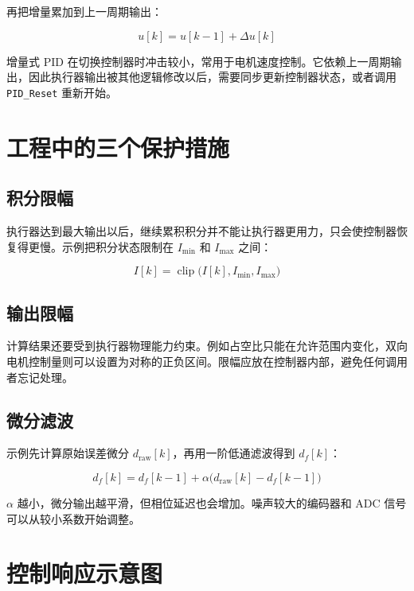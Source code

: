 再把增量累加到上一周期输出：

\begin{equation}
u[k]=u[k-1]+\Delta u[k]
\end{equation}

增量式 PID 在切换控制器时冲击较小，常用于电机速度控制。它依赖上一周期输出，因此执行器输出被其他逻辑修改以后，需要同步更新控制器状态，或者调用 \texttt{PID\_Reset} 重新开始。

\section{工程中的三个保护措施}

\subsection{积分限幅}

执行器达到最大输出以后，继续累积积分并不能让执行器更用力，只会使控制器恢复得更慢。示例把积分状态限制在 $I_{\min}$ 和 $I_{\max}$ 之间：

\begin{equation}
I[k]=\operatorname{clip}\bigl(I[k],I_{\min},I_{\max}\bigr)
\end{equation}

\subsection{输出限幅}

计算结果还要受到执行器物理能力约束。例如占空比只能在允许范围内变化，双向电机控制量则可以设置为对称的正负区间。限幅应放在控制器内部，避免任何调用者忘记处理。

\subsection{微分滤波}

示例先计算原始误差微分 $d_{\mathrm{raw}}[k]$，再用一阶低通滤波得到 $d_f[k]$：

\begin{equation}
d_f[k]=d_f[k-1]+\alpha\bigl(d_{\mathrm{raw}}[k]-d_f[k-1]\bigr)
\end{equation}

$\alpha$ 越小，微分输出越平滑，但相位延迟也会增加。噪声较大的编码器和 ADC 信号可以从较小系数开始调整。

\section{控制响应示意图}

